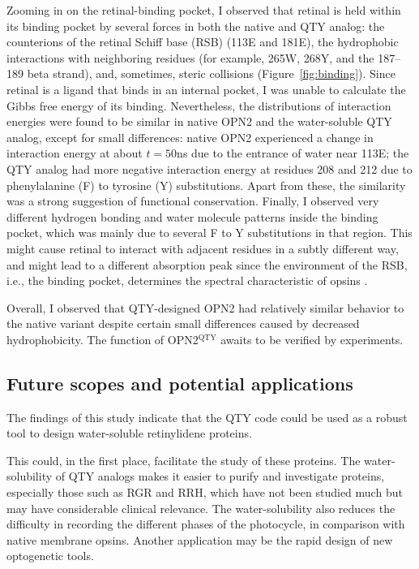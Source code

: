 \documentclass[fleqn, 10pt]{manuscript}
\begin{document}
Zooming in on the retinal-binding pocket, I observed that retinal is held within its binding pocket by several forces in both the native and QTY analog: the counterions of the retinal Schiff base (RSB) (113E and 181E), the hydrophobic interactions with neighboring residues (for example, 265W, 268Y, and the 187--189 beta strand), and, sometimes, steric collisions (Figure~\ref{fig:binding}). Since retinal is a ligand that binds in an internal pocket, I was unable to calculate the Gibbs free energy of its binding. Nevertheless, the distributions of interaction energies were found to be similar in native OPN2 and the water-soluble QTY analog, except for small differences: native OPN2 experienced a change in interaction energy at about $t=50$ns due to the entrance of water near 113E; the QTY analog had more negative interaction energy at residues 208 and 212 due to phenylalanine (F) to tyrosine (Y) substitutions. Apart from these, the similarity was a strong suggestion of functional conservation. Finally, I observed very different hydrogen bonding and water molecule patterns inside the binding pocket, which was mainly due to several F to Y substitutions in that region. This might cause retinal to interact with adjacent residues in a subtly different way, and might lead to a different absorption peak since the environment of the RSB, i.e., the binding pocket, determines the spectral characteristic of opsins \citep{Fenno_2011}. 

Overall, I observed that QTY-designed OPN2 had relatively similar behavior to the native variant despite certain small differences caused by decreased hydrophobicity. The function of OPN2$^{\textrm{QTY}}$ awaits to be verified by experiments. 

\subsection*{Future scopes and potential applications}

The findings of this study indicate that the QTY code could be used as a robust tool to design water-soluble retinylidene proteins. 

This could, in the first place, facilitate the study of these proteins. The water-solubility of QTY analogs makes it easier to purify and investigate proteins, especially those such as RGR and RRH, which have not been studied much but may have considerable clinical relevance. The water-solubility also reduces the difficulty in recording the different phases of the photocycle, in comparison with native membrane opsins. Another application may be the rapid design of new optogenetic tools. 
\end{document}
